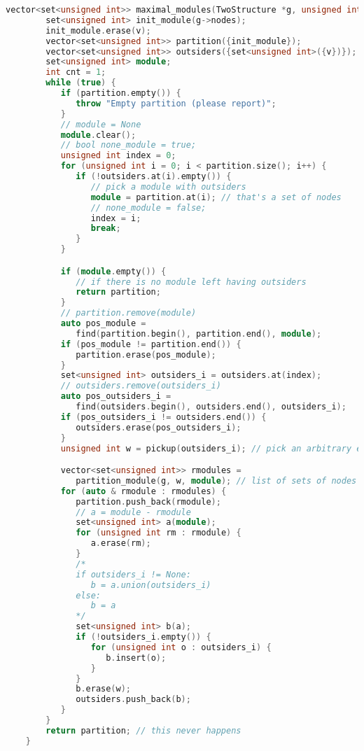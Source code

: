 \begin{lstlisting}[language=C++, style=cpp, caption={Defining Maximale Module}, label={lst:cpp-define-maximal-module}, firstnumber=1]
    vector<set<unsigned int>> maximal_modules(TwoStructure *g, unsigned int v) {
        set<unsigned int> init_module(g->nodes);
        init_module.erase(v);
        vector<set<unsigned int>> partition({init_module});
        vector<set<unsigned int>> outsiders({set<unsigned int>({v})});
        set<unsigned int> module;
        int cnt = 1;
        while (true) {
           if (partition.empty()) {
              throw "Empty partition (please report)";
           }
           // module = None
           module.clear();
           // bool none_module = true;
           unsigned int index = 0;
           for (unsigned int i = 0; i < partition.size(); i++) {
              if (!outsiders.at(i).empty()) {
                 // pick a module with outsiders
                 module = partition.at(i); // that's a set of nodes
                 // none_module = false;
                 index = i;
                 break;
              }
           }

           if (module.empty()) {
              // if there is no module left having outsiders
              return partition;
           }
           // partition.remove(module)
           auto pos_module =
              find(partition.begin(), partition.end(), module);
           if (pos_module != partition.end()) {
              partition.erase(pos_module);
           }
           set<unsigned int> outsiders_i = outsiders.at(index);
           // outsiders.remove(outsiders_i)
           auto pos_outsiders_i =
              find(outsiders.begin(), outsiders.end(), outsiders_i);
           if (pos_outsiders_i != outsiders.end()) {
              outsiders.erase(pos_outsiders_i);
           }
           unsigned int w = pickup(outsiders_i); // pick an arbitrary element

           vector<set<unsigned int>> rmodules =
              partition_module(g, w, module); // list of sets of nodes
           for (auto & rmodule : rmodules) {
              partition.push_back(rmodule);
              // a = module - rmodule
              set<unsigned int> a(module);
              for (unsigned int rm : rmodule) {
                 a.erase(rm);
              }
              /*
              if outsiders_i != None:
                 b = a.union(outsiders_i)
              else:
                 b = a
              */
              set<unsigned int> b(a);
              if (!outsiders_i.empty()) {
                 for (unsigned int o : outsiders_i) {
                    b.insert(o);
                 }
              }
              b.erase(w);
              outsiders.push_back(b);
           }
        }
        return partition; // this never happens
    }

\end{lstlisting}


